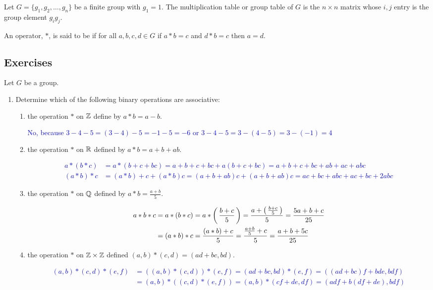 \documentclass[10pt,a4paper]{report}
\newcommand{\BLUE}[1]{\textcolor{blue}{#1}}
\begin{document}
\begin{definition} Let $G=\{g_1, g_2,\dots,g_n\}$ be a finite group with $g_1 = 1$.  The multiplication table or group table of $G$ is the $n\times n$ matrix whose $i,j$ entry is the group element $g_ig_j$.
\end{definition}

\begin{definition} An operator, $*$, is said to be  if for all $a,b,c,d \in G$  if $a*b=c$ and $d*b=c$ then $a=d$.
\end{definition}

\subsection{Exercises}

Let $G$ be a group.
\begin{enumerate}
	\item Determine which of the following binary operations are associative:
	\begin{enumerate}
		\item the operation $*$ on $\mathbb{Z}$ define by $ a*b=a-b$.
		
		\BLUE{No, because $3-4-5 = (3-4)-5 = -1-5=-6$ or $3-4-5 = 3-(4-5) = 3-(-1) = 4$}
		
		\item the operation $*$ on $\mathbb{R}$ defined by $a*b=a+b+ab$.

		\BLUE{\begin{align*}
			a*(b*c) &= a*(b+c+bc) = a+b+c+bc+a(b+c+bc) = a+b+c+bc+ab+ac+abc \\
			(a*b)*c &= (a*b)+c+ (a*b)c = (a + b + ab)c+ (a+b+ab)c = ac+bc+abc+ac+bc+2abc
		\end{align*}}		
		
		\item the operation $*$ on $\mathbb{Q}$ defined by $a*b=\frac{a+b}{5}$.
		
		\BLUE{\begin{align*}
			a*b*c &= a*(b*c) = a*\left (\, \frac{b+c}{5} \,\right ) = \frac{a+\left (\, \frac{b+c}{5} \,\right )}{5} = \frac{5a+b+c}{25} \\
			&= (a*b)*c = \frac{(a*b)+c}{5}= \frac{\frac{a+b}{5}+c}{5} = \frac{a+b+5c}{25}
		\end{align*}}
		
		\item the operation $*$ on $\mathbb{Z} \times \mathbb{Z}$ defined $(a,b)*(c,d)=(ad+bc, bd)$.
		
		\BLUE{\begin{align*}
			(a,b)*(c,d)*(e,f) &= ((a,b)*(c,d))*(e,f) = (ad+bc, bd)*(e,f)=((ad+bc)f+bde, bdf) \\
			&= (a,b)*((c,d)*(e,f)) = (a,b)*(cf+de, df) = (adf+b(df+de),bdf)
		\end{align*}		 }
		

\end{enumerate}
\end{enumerate}
\end{document}
